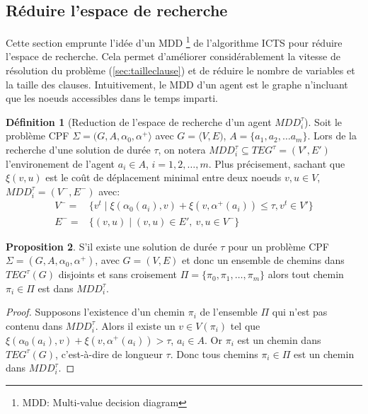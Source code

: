 \documentclass[french, 12pt, letterpaper]{article}
\theoremstyle{definition}
\newtheorem{definition}{Définition}[subsection]
\theoremstyle{proposition}
\newtheorem{proposition}[definition]{Proposition}
\theoremstyle{example}
\begin{document}
    \subsection{Réduire l'espace de recherche}
    \label{sec:mdd}

    Cette section emprunte l'idée d'un MDD \footnote{MDD: Multi-value decision diagram} de l'algorithme ICTS \cite{ICTS} pour réduire l'espace de recherche. 
    Cela permet d'améliorer considérablement la vitesse de résolution du problème (\ref{sec:tailleclause}) et
    de réduire le nombre de variables et la taille des clauses.
    Intuitivement, le MDD d'un agent est le graphe n'incluant que les noeuds accessibles dans le temps imparti.

    \begin{definition}[Reduction de l'espace de recherche d'un agent $MDD_i^\tau$]
        Soit le problème CPF $\Sigma = ( G, A, \alpha_0, \alpha^+ \rangle$ avec $G = \langle V, E )$, $A = \{a_1, a_2, \ldots a_m\}$.
        Lors de la recherche d'une solution de durée $\tau$, on notera $MDD_i^\tau \subseteq TEG^\tau = ( V', E' )$ l'environement de l'agent 
        $a_i \in A$, $i = 1, 2, \dots, m$. Plus précisement, sachant que $\xi(v, u)$ est le coût de déplacement minimal entre deux noeuds $v, u \in V$, 
        $MDD_i^\tau = ( V^-, E^- )$ avec:
        \begin{align*}
            V^- =& \{v^t\;|\; \xi(\alpha_0(a_i), v) + \xi(v, \alpha^+(a_i)) \leq \tau, v^t \in V'\}\\
            E^- =& \{( v, u ) \;|\; ( v, u ) \in E',\ v, u \in V^-\}
        \end{align*} 
    \end{definition}

    \begin{proposition}
        S'il existe une solution de durée $\tau$ pour un problème CPF $\Sigma = ( G, A, \alpha_0, \alpha^+ )$,
        avec $G = ( V, E )$
        et donc un ensemble de chemins dans $TEG^\tau(G)$ disjoints et sans croisement $\Pi = \{\pi_0, \pi_1, \ldots, \pi_m\}$ alors tout chemin
        $\pi_i \in \Pi$ est dans $MDD^\tau_i$.
    \end{proposition}

    \begin{proof}
        Supposons l'existence d'un chemin $\pi_i$ de l'ensemble $\Pi$ qui n'est pas contenu dans $MDD_i^\tau$.
        Alors il existe un $v \in V(\pi_i)$ tel que $\xi(\alpha_0(a_i), v) + \xi(v, \alpha^+(a_i)) > \tau$, $a_i \in A$.
        Or $\pi_i$ est un chemin dans $TEG^\tau(G)$, c'est-à-dire de longueur $\tau$.
        Donc tous chemins $\pi_i \in \Pi$ est un chemin dans $MDD_i^\tau$. 
    \end{proof}
\end{document}
